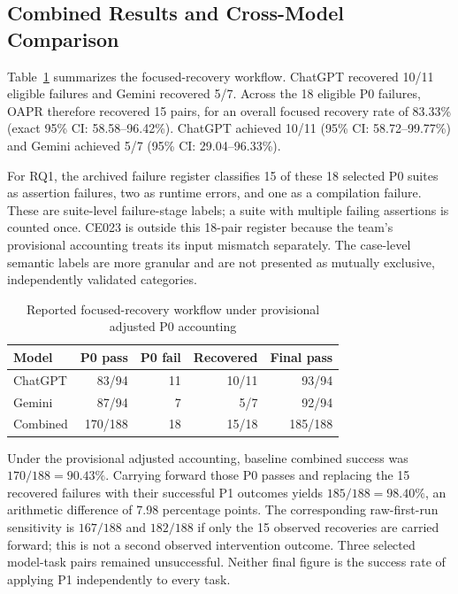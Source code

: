 \documentclass[conference]{IEEEtran}
\begin{document}
\subsection{Combined Results and Cross-Model Comparison}
Table~\ref{tab:combined} summarizes the focused-recovery workflow. ChatGPT recovered 10/11 eligible failures and Gemini recovered 5/7. Across the 18 eligible P0 failures, OAPR therefore recovered 15 pairs, for an overall focused recovery rate of 83.33\% (exact 95\% CI: 58.58--96.42\%). ChatGPT achieved 10/11 (95\% CI: 58.72--99.77\%) and Gemini achieved 5/7 (95\% CI: 29.04--96.33\%).

For RQ1, the archived failure register classifies 15 of these 18 selected P0 suites as assertion failures, two as runtime errors, and one as a compilation failure. These are suite-level failure-stage labels; a suite with multiple failing assertions is counted once. CE023 is outside this 18-pair register because the team's provisional accounting treats its input mismatch separately. The case-level semantic labels are more granular and are not presented as mutually exclusive, independently validated categories.

\begin{table}[t]
\caption{Reported focused-recovery workflow under provisional adjusted P0 accounting}
\label{tab:combined}
\centering
\scriptsize
\begin{tabular}{@{}lrrrr@{}}
\toprule
Model & P0 pass & P0 fail & Recovered & Final pass \\
\midrule
ChatGPT & 83/94 & 11 & 10/11 & 93/94 \\
Gemini & 87/94 & 7 & 5/7 & 92/94 \\
\midrule
Combined & 170/188 & 18 & 15/18 & 185/188 \\
\bottomrule
\end{tabular}
\end{table}

Under the provisional adjusted accounting, baseline combined success was $170/188=90.43\%$. Carrying forward those P0 passes and replacing the 15 recovered failures with their successful P1 outcomes yields $185/188=98.40\%$, an arithmetic difference of 7.98 percentage points. The corresponding raw-first-run sensitivity is $167/188$ and $182/188$ if only the 15 observed recoveries are carried forward; this is not a second observed intervention outcome. Three selected model-task pairs remained unsuccessful. Neither final figure is the success rate of applying P1 independently to every task.
\end{document}
